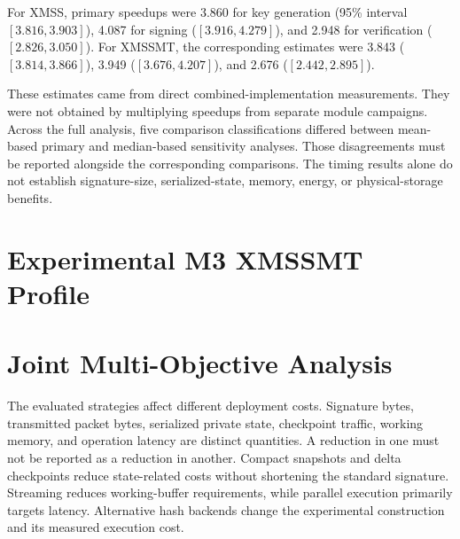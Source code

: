 \documentclass[pdflatex,sn-mathphys-num]{sn-jnl}
\begin{document}
For XMSS, primary speedups were 3.860 for key generation
(95\% interval $[3.816,3.903]$), 4.087 for signing
($[3.916,4.279]$), and 2.948 for verification
($[2.826,3.050]$). For XMSSMT, the corresponding estimates were
3.843 ($[3.814,3.866]$), 3.949 ($[3.676,4.207]$), and
2.676 ($[2.442,2.895]$).

These estimates came from direct combined-implementation measurements.
They were not obtained by multiplying speedups from separate module
campaigns. Across the full analysis, five comparison classifications
differed between mean-based primary and median-based sensitivity
analyses. Those disagreements must be reported alongside the
corresponding comparisons. The timing results alone do not establish
signature-size, serialized-state, memory, energy, or physical-storage
benefits.

\section{Experimental M3 XMSSMT Profile}
\label{sec:m3}















\section{Joint Multi-Objective Analysis}
\label{sec:joint}

The evaluated strategies affect different deployment costs.
Signature bytes, transmitted packet bytes, serialized private state,
checkpoint traffic, working memory, and operation latency are distinct
quantities. A reduction in one must not be reported as a reduction in
another. Compact snapshots and delta checkpoints reduce state-related
costs without shortening the standard signature. Streaming reduces
working-buffer requirements, while parallel execution primarily targets
latency. Alternative hash backends change the experimental construction
and its measured execution cost.
\end{document}
